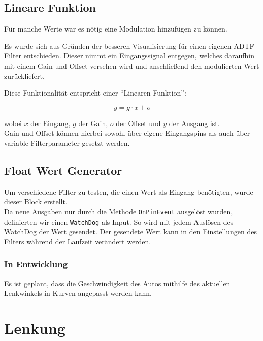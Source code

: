 \documentclass[a4paper,12pt]{report}
\begin{document}
\section{Lineare Funktion}


	Für manche Werte war es nötig eine Modulation hinzufügen zu können.

	Es wurde sich aus Gründen der besseren Visualisierung für einen eigenen ADTF-Filter entschieden.
	Dieser nimmt ein Eingangssignal entgegen, welches daraufhin mit einem Gain und Offset versehen wird und anschließend den modulierten Wert zurückliefert.

	Diese Funktionalität entspricht einer ``Linearen Funktion'':

	\[y = g \cdot x + o\]

	wobei $x$ der Eingang, $g$ der Gain, $o$ der Offset und $y$ der Ausgang ist.
	\\
	Gain und Offset können hierbei sowohl über eigene Eingangspins als auch über variable Filterparameter gesetzt werden.


\section{Float Wert Generator}

	Um verschiedene Filter zu testen, die einen Wert als Eingang benötigten, wurde dieser Block erstellt.\\
	Da neue Ausgaben nur durch die Methode \texttt{OnPinEvent} ausgelöst wurden, definierten wir einen \texttt{WatchDog} als Input. 
	So wird mit jedem Auslösen des WatchDog der Wert gesendet. 
	Der gesendete Wert kann in den Einstellungen des Filters während der Laufzeit verändert werden.


\subsection{In Entwicklung}

	Es ist geplant, dass die Geschwindigkeit des Autos mithilfe des aktuellen Lenkwinkels in Kurven angepasst werden kann.

\chapter{Lenkung}
\end{document}
